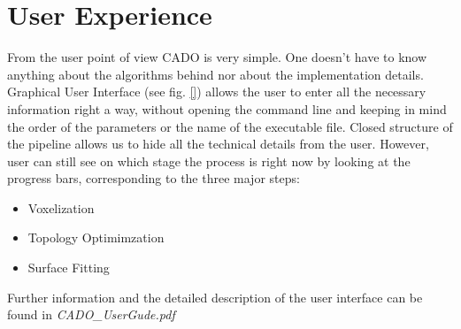 \section{User Experience}
\label{sec:uex}
From the user point of view CADO  is very simple. One doesn't have to know anything about the algorithms behind nor about the implementation details. Graphical User Interface (see fig. \ref{}) allows the user to enter all the necessary information right a way, without opening the command line and keeping in mind the order of the parameters or the name of the executable file. Closed structure of the pipeline allows us to hide all the technical details from the user. However, user can still see on which stage the process is right now by looking at the progress bars, corresponding to the three major steps:
\begin{itemize}
\item Voxelization
\item Topology Optimimzation
\item Surface Fitting
\end{itemize}

Further information and the detailed description of the user interface can be found in \textit{CADO\_UserGude.pdf}

